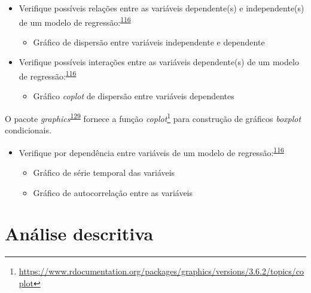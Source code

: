 \documentclass[
  a4paper,
]{book}
\providecommand{\tightlist}{%
  \setlength{\itemsep}{0pt}\setlength{\parskip}{0pt}}
\renewcommand{\href}[2]{#2\footnote{\url{#1}}}
\newenvironment{infobox}[1]
  {
  \begin{itemize}
  \renewcommand{\labelitemi}{
    \raisebox{-.7\height}[0pt][0pt]{
      {\setkeys{Gin}{width=3em,keepaspectratio}
        \texttt{[image: \#1]}}
    }
  }
  \setlength{\fboxsep}{1em}
  \begin{blackbox}
  \item
  }
  {
  \end{blackbox}
  \end{itemize}
  }
\begin{document}
\begin{itemize}
\item
  Verifique possíveis relações entre as variáveis dependente(s) e independente(s) de um modelo de regressão:\textsuperscript{\protect\hyperlink{ref-zuur2009}{116}}

  \begin{itemize}
  \tightlist
  \item
    Gráfico de dispersão entre variáveis independente e dependente
  \end{itemize}
\end{itemize}

\begin{itemize}
\item
  Verifique possíveis interações entre as variáveis dependente(s) de um modelo de regressão:\textsuperscript{\protect\hyperlink{ref-zuur2009}{116}}

  \begin{itemize}
  \tightlist
  \item
    Gráfico \emph{coplot} de dispersão entre variáveis dependentes
  \end{itemize}
\end{itemize}

\begin{infobox}{images/Rlogo}
O pacote \emph{graphics}\textsuperscript{\protect\hyperlink{ref-graphics}{129}} fornece a função \href{https://www.rdocumentation.org/packages/graphics/versions/3.6.2/topics/coplot}{\emph{coplot}} para construção de gráficos \emph{boxplot} condicionais.

\end{infobox}

\begin{itemize}
\item
  Verifique por dependência entre variáveis de um modelo de regressão:\textsuperscript{\protect\hyperlink{ref-zuur2009}{116}}

  \begin{itemize}
  \item
    Gráfico de série temporal das variáveis
  \item
    Gráfico de autocorrelação entre as variáveis
  \end{itemize}
\end{itemize}

\hypertarget{analise-descritiva}{%
\chapter{\texorpdfstring{\textbf{Análise descritiva}}{Análise descritiva}}\label{analise-descritiva}}
\end{document}
